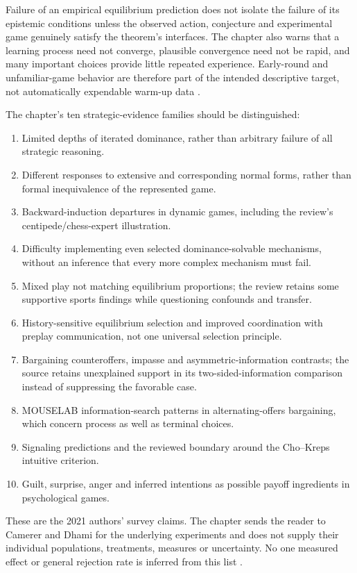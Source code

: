 Failure of an empirical equilibrium prediction does not isolate the failure
of its epistemic conditions unless the observed action, conjecture and
experimental game genuinely satisfy the theorem's interfaces. The chapter
also warns that a learning process need not converge, plausible convergence
need not be rapid, and many important choices provide little repeated
experience. Early-round and unfamiliar-game behavior are therefore part of
the intended descriptive target, not automatically expendable warm-up data
\cite[pp.~568, 571--572]{DhamiAlNowaihi2021Economics}.

The chapter's ten strategic-evidence families should be distinguished:
\begin{enumerate}
\item Limited depths of iterated dominance, rather than arbitrary failure
      of all strategic reasoning.
\item Different responses to extensive and corresponding normal forms,
      rather than formal inequivalence of the represented game.
\item Backward-induction departures in dynamic games, including the review's
      centipede/chess-expert illustration.
\item Difficulty implementing even selected dominance-solvable mechanisms,
      without an inference that every more complex mechanism must fail.
\item Mixed play not matching equilibrium proportions; the review retains
      some supportive sports findings while questioning confounds and transfer.
\item History-sensitive equilibrium selection and improved coordination
      with preplay communication, not one universal selection principle.
\item Bargaining counteroffers, impasse and asymmetric-information contrasts;
      the source retains unexplained support in its two-sided-information
      comparison instead of suppressing the favorable case.
\item MOUSELAB information-search patterns in alternating-offers bargaining,
      which concern process as well as terminal choices.
\item Signaling predictions and the reviewed boundary around the
      Cho--Kreps intuitive criterion.
\item Guilt, surprise, anger and inferred intentions as possible payoff
      ingredients in psychological games.
\end{enumerate}
These are the 2021 authors' survey claims. The chapter sends the reader
to Camerer and Dhami for the underlying experiments and does not supply
their individual populations, treatments, measures or uncertainty. No one
measured effect or general rejection rate is inferred from this list
\cite[pp.~571--572]{DhamiAlNowaihi2021Economics}.

